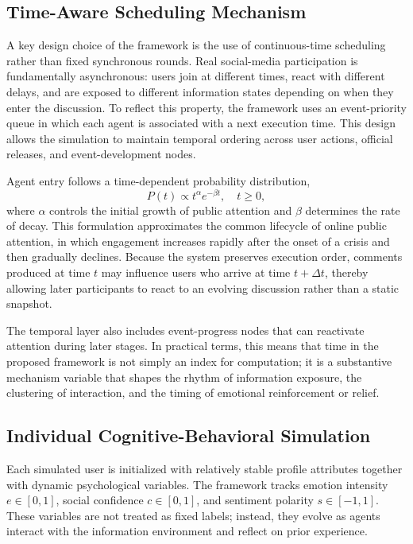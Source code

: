 \documentclass[11pt]{article}
\begin{document}
\subsection{Time-Aware Scheduling Mechanism}
A key design choice of the framework is the use of continuous-time scheduling rather than fixed synchronous rounds. Real social-media participation is fundamentally asynchronous: users join at different times, react with different delays, and are exposed to different information states depending on when they enter the discussion. To reflect this property, the framework uses an event-priority queue in which each agent is associated with a next execution time. This design allows the simulation to maintain temporal ordering across user actions, official releases, and event-development nodes.

Agent entry follows a time-dependent probability distribution,
\[
P(t) \propto t^{\alpha} e^{-\beta t}, \quad t \geq 0,
\]
where $\alpha$ controls the initial growth of public attention and $\beta$ determines the rate of decay. This formulation approximates the common lifecycle of online public attention, in which engagement increases rapidly after the onset of a crisis and then gradually declines. Because the system preserves execution order, comments produced at time $t$ may influence users who arrive at time $t+\Delta t$, thereby allowing later participants to react to an evolving discussion rather than a static snapshot.

The temporal layer also includes event-progress nodes that can reactivate attention during later stages. In practical terms, this means that time in the proposed framework is not simply an index for computation; it is a substantive mechanism variable that shapes the rhythm of information exposure, the clustering of interaction, and the timing of emotional reinforcement or relief.

\subsection{Individual Cognitive-Behavioral Simulation}
Each simulated user is initialized with relatively stable profile attributes together with dynamic psychological variables. The framework tracks emotion intensity $e \in [0,1]$, social confidence $c \in [0,1]$, and sentiment polarity $s \in [-1,1]$. These variables are not treated as fixed labels; instead, they evolve as agents interact with the information environment and reflect on prior experience.
\end{document}
